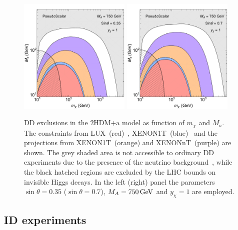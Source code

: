\documentclass[a4paper, 11pt,notoc]{article}
\newcommand{\hdma}{\ensuremath{\textrm{2HDM+a}}\xspace}
\begin{document}
\begin{figure}[t!]
\begin{center}
\includegraphics[width=0.475\textwidth]{PseudoS035.pdf} \quad 
\includegraphics[width=0.475\textwidth]{PseudoS07.pdf}
\vspace{4mm}
\caption{DD exclusions in the \hdma model as function of $m_\chi$ and $M_a$. The constraints from LUX~(red)~\cite{Akerib:2016vxi}, XENON1T~(blue)~\cite{Aprile:2017iyp} and the projections from XENON1T~(orange) and XENONnT~(purple) \cite{Aprile:2015uzo} are shown. The grey shaded area is not accessible to ordinary DD experiments due to the presence of the neutrino background~\cite{Billard:2013qya}, while the   black hatched regions are excluded by the LHC bounds on invisible Higgs decays. In the left (right) panel the parameters $\sin \theta = 0.35$ ($\sin \theta = 0.7$), $M_A = 750 \, {\rm GeV}$ and $y_\chi = 1$ are employed.} 
\label{fig:PSDD}
\end{center}
\end{figure} 

\subsection{ID experiments}
\end{document}
